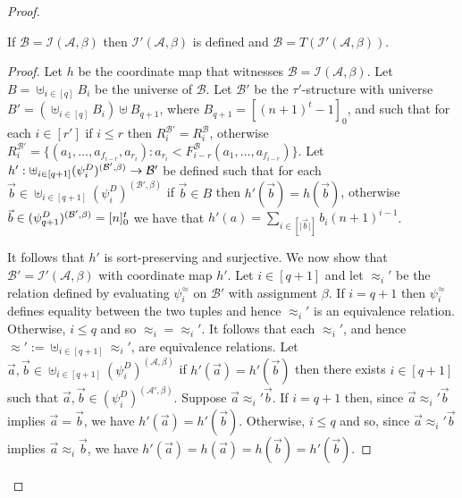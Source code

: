 \documentclass[../main/thesis.tex]{subfiles}
\begin{document}
\begin{proof}
  \begin{claim}
    If $\mathcal{B} = \mathcal{I}(\mathcal{A}, \beta)$ then
    $\mathcal{I}'(\mathcal{A}, \beta)$ is defined and $\mathcal{B} =
    T(\mathcal{I}'(\mathcal{A}, \beta))$.
    \label{claim:not-to-dash}
  \end{claim}
  \begin{proof}
    Let $h$ be the coordinate map that witnesses $\mathcal{B} =
    \mathcal{I}(\mathcal{A}, \beta)$. Let $B = \uplus_{i \in [q]} B_i$ be the
    universe of $\mathcal{B}$. Let $\mathcal{B}'$ be the $\tau'$-structure with
    universe $B' = (\uplus_{i \in [q]} B_i) \uplus B_{q + 1}$, where $B_{q+1} =
    [(n+1)^t - 1]_0$, and such that for each $i \in [r']$ if $i \leq r$ then
    $R^{\mathcal{B}'}_i = R^{\mathcal{B}}_i$, otherwise $R^{\mathcal{B}'}_i =
    \{(a_1, \ldots, a_{f_{i - r}}, a_{r_i}) : a_{r_i} < F^{\mathcal{B}}_{i -
      r}(a_1, \ldots, a_{f_{i - r}}) \}$. Let $h' : \uplus_{i \in [q+1]}
    (\psi^D_i)^{(\mathcal{B}', \beta)} \rightarrow \mathcal{B}'$ be defined such that
    for each $\vec{b} \in \uplus_{i \in [q+1]} (\psi^D_i)^{(\mathcal{B}',
      \beta)}$ if $\vec{b} \in B$ then $h'(\vec{b}) = h(\vec{b})$, otherwise
    $\vec{b} \in (\psi^D_{q+1})^{(\mathcal{B}', \beta)} = [n]^{t}_0$ we
    have that $h'(a) = \sum_{i \in [\vert \vec{b} \vert]} b_i (n+1)^{i-1}$.

    It follows that $h'$ is sort-preserving and surjective. We now show that
    $\mathcal{B}' = \mathcal{I}'(\mathcal{A}, \beta)$ with coordinate map $h'$.
    Let $i \in [q+1]$ and let $\approx_i'$ be the relation defined by evaluating
    $\psi^{\approx}_i$ on $\mathcal{B}'$ with assignment $\beta$. If $i = q + 1
    $ then $\psi^\approx_i$ defines equality between the two tuples and hence
    $\approx_i'$ is an equivalence relation. Otherwise, $i \leq q$ and so
    $\approx_i = \approx_i'$. It follows that each $\approx_i'$, and hence
    $\approx' := \uplus_{i \in [q+1]} \approx_i'$, are equivalence relations.
    Let $\vec{a}, \vec{b} \in \uplus_{i \in [q + 1]}(\psi^D_i)^{(\mathcal{A},
      \beta)}$ if $h'(\vec{a}) = h'(\vec{b})$ then there exists $i \in [q + 1]$
    such that $\vec{a}, \vec{b} \in (\psi^D_i)^{(\mathcal{A}', \beta)}$. Suppose
    $\vec{a} \approx_i' \vec{b}$. If $i = q + 1$ then, since $\vec{a} \approx_i'
    \vec{b}$ implies $\vec{a} = \vec{b}$, we have $h'(\vec{a}) = h'(\vec{b})$.
    Otherwise, $i \leq q$ and so, since $\vec{a} \approx_i' \vec{b}$ implies
    $\vec{a} \approx_i \vec{b}$, we have $h'(\vec{a}) = h(\vec{a}) = h(\vec{b})
    = h'(\vec{b})$.


\end{proof}
\end{proof}
\end{document}
